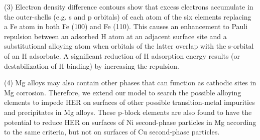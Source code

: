 (3) Electron density difference contours show that excess electrons accumulate in the outer-shells (e.g. s and p orbitals) of each atom of the six elements replacing a Fe atom in both Fe (100) and Fe (110). This causes an enhancement to Pauli repulsion between an adsorbed H atom at an adjacent surface site and a substitutional alloying atom when orbitals of the latter overlap with the s-orbital of an H adsorbate. A significant reduction of H adsorption energy results (or destabilization of H binding) by increasing the repulsion.

(4) Mg alloys may also contain other phases that can function as cathodic sites in Mg corrosion. Therefore, we extend our model to search the possible alloying elements to impede \ac{HER} on surfaces of other possible transition-metal impurities and precipitates in Mg alloys. These p-block elements are also found to have the potential to reduce \ac{HER} on surfaces of Ni second-phase particles in Mg according to the same criteria, but not on surfaces of Cu second-phase particles. 